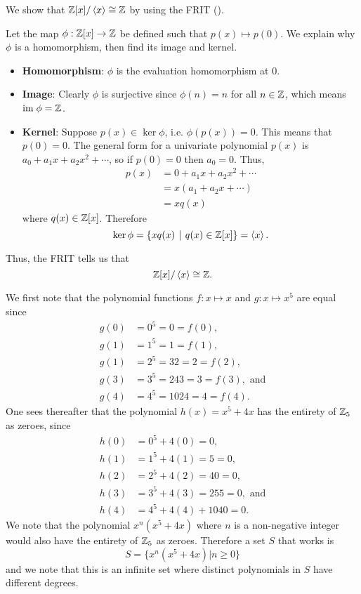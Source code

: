 \begin{questions}
    \item We show that $\mathbb{Z}[x] / \left\langle x\right\rangle \cong \mathbb{Z}$ by using the FRIT ().

    Let the map $\phi: \mathbb{Z}[x] \to \mathbb{Z}$ be defined such that $p(x) \mapsto p(0)$. We explain why $\phi$ is a homomorphism, then find its image and kernel.
    \begin{itemize}
        \item \textbf{Homomorphism}: $\phi$ is the evaluation homomorphism at 0.
        \item \textbf{Image}: Clearly $\phi$ is surjective since $\phi(n) = n$ for all $n \in \mathbb{Z}$, which means $\mathrm{im}\;\phi = \mathbb{Z}$.
        \item \textbf{Kernel}: Suppose $p(x) \in \ker\phi$, i.e. $\phi(p(x)) = 0$. This means that $p(0) = 0$. The general form for a univariate polynomial $p(x)$ is $a_0 + a_1x + a_2x^2 + \cdots$, so if $p(0) = 0$ then $a_0 = 0$. Thus,
        \begin{align*}
            p(x) &= 0 + a_1x + a_2x^2 + \cdots\\
            &= x(a_1 + a_2x + \cdots)\\
            &= xq(x)
        \end{align*}
        where $q(x) \in \mathbb{Z}[x]$. Therefore
        \[
            \ker\phi = \{xq(x) \vert q(x) \in \Z[x]\} = \princ{x}.
        \]
    \end{itemize}

    Thus, the FRIT tells us that
    \[
        \mathbb{Z}[x] / \left\langle x\right\rangle \cong \mathbb{Z}.
    \]

    \item We first note that the polynomial functions $f: x \mapsto x$ and $g: x \mapsto x^5$ are equal since
    \begin{align*}
        g(0) &= 0^5 = 0 = f(0),\\
        g(1) &= 1^5 = 1 = f(1),\\
        g(1) &= 2^5 = 32 = 2 = f(2),\\
        g(3) &= 3^5 = 243 = 3 = f(3), \text{ and}\\
        g(4) &= 4^5 = 1024 = 4 = f(4).
    \end{align*}
    One sees thereafter that the polynomial $h(x) = x^5 + 4x$ has the entirety of $\mathbb{Z}_5$ as zeroes, since
    \begin{align*}
        h(0) &= 0^5 + 4(0) = 0,\\
        h(1) &= 1^5 + 4(1) = 5 = 0,\\
        h(2) &= 2^5 + 4(2) = 40 = 0,\\
        h(3) &= 3^5 + 4(3) = 255 = 0, \text{ and}\\
        h(4) &= 4^5 + 4(4) + 1040 = 0.
    \end{align*}
    We note that the polynomial $x^n(x^5 + 4x)$ where $n$ is a non-negative integer would also have the entirety of $\mathbb{Z}_5$ as zeroes. Therefore a set $S$ that works is
    \[
        S = \{x^n(x^5+4x) \vert n \geq 0\}
    \]
    and we note that this is an infinite set where distinct polynomials in $S$ have different degrees.


\end{questions}
